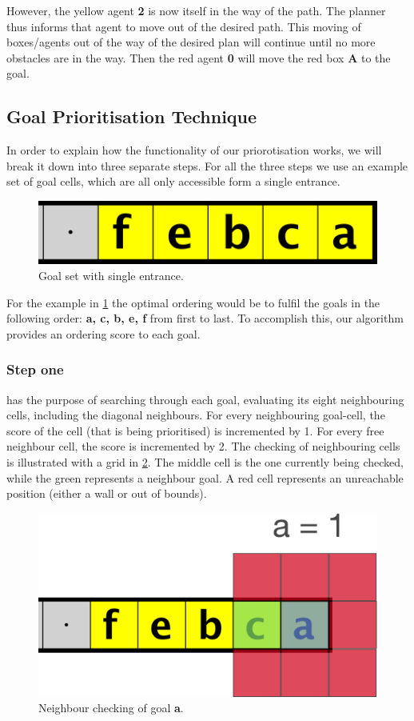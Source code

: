 However, the yellow agent \textbf{2} is now itself in the way of the path.
The planner thus informs that agent to move out of the desired path.
This moving of boxes/agents out of the way of the desired plan will continue until no more obstacles are in the way.
Then the red agent \textbf{0} will move the red box \textbf{A} to the goal.

\subsection{Goal Prioritisation Technique}
\label{methods:goal_ordering}

In order to explain how the functionality of our priorotisation works, we will break it down into three separate steps. For all the three steps we use an example set of goal cells, which are all only accessible form a single entrance. 

\begin{figure}[h!]
  \centering
  \includegraphics[width=.5\columnwidth]{graphics/ie_level.png}
  \caption{\label{fig:sample}Goal set with single entrance.}
\end{figure}

For the example in \cref{fig:sample} the optimal ordering would be to fulfil the goals in the following order: \textbf{a, c, b, e, f} from first to last. 
To accomplish this, our algorithm provides an ordering score to each goal. 

\subsubsection{Step one}has the purpose of searching through each goal, evaluating its eight neighbouring cells, including the diagonal neighbours. 
For every neighbouring goal-cell, the score of the cell (that is being prioritised) is incremented by 1.
For every free neighbour cell, the score is incremented by 2. 
The checking of neighbouring cells is illustrated with a grid in \cref{fig:grid1}. 
The middle cell is the one currently being checked, while the green represents a neighbour goal. 
A red cell represents an unreachable position (either a wall or out of bounds).

\begin{figure}[ht!]
  \centering
  \includegraphics[width=.5\columnwidth]{graphics/goal_pri_1.png}
  \caption{\label{fig:grid1}Neighbour checking of goal \textbf{a}.}
\end{figure}

